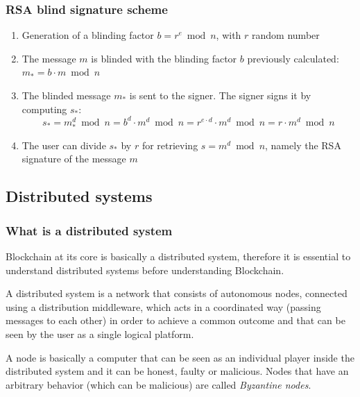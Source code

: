 \subsubsection{RSA blind signature scheme}
\begin{enumerate}
  \item Generation of a blinding factor $b=r^{e}\bmod n$,
  with $r$ random number
  \item The message $m$ is blinded with the blinding factor $b$ previously
  calculated: $m_{*}=b\cdot m\bmod n$
  \item The blinded message $m_*$ is sent to the signer. The signer signs it by
  computing $s_*$:
  \[ s_*=m_*^d\bmod n = b^d\cdot m^d\bmod n = r^{e\cdot d}\cdot m^d \bmod n = r\cdot m^d \bmod n \]
  \item The user can divide $s_*$ by $r$ for retrieving $s=m^d\bmod n$, namely
  the RSA signature of the message $m$
\end{enumerate}











\subsection{Distributed systems}
\subsubsection{What is a distributed system}
Blockchain at its core is basically a distributed system, therefore it is essential
to understand distributed systems before understanding Blockchain.

A distributed system is a network that consists of autonomous nodes, connected
using a distribution middleware, which acts in a coordinated way (passing
messages to each other) in order to achieve a common outcome and that can be
seen by the user as a single logical platform.

A node is basically a computer that can be seen as an individual player inside
the distributed system and it can be honest, faulty or malicious. Nodes that
have an arbitrary behavior (which can be malicious) are called \emph{Byzantine nodes}.

